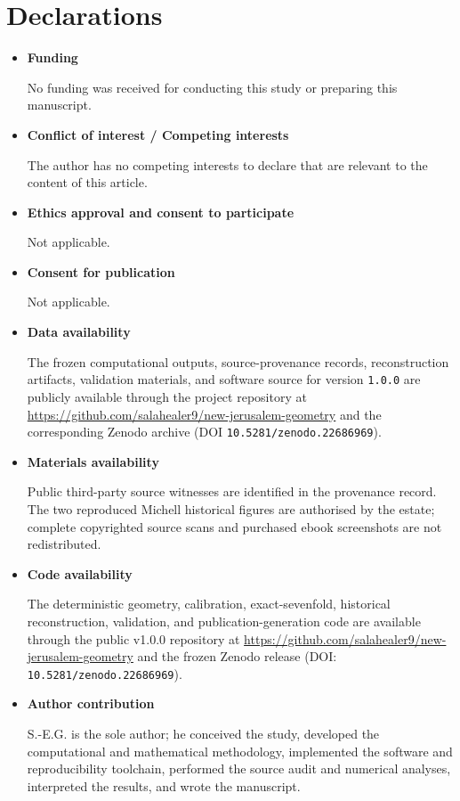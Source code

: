\documentclass[11pt]{article}
\begin{document}
\section*{Declarations}

\begin{itemize}

\item \textbf{Funding}

No funding was received for conducting this study or preparing this
manuscript.

\item \textbf{Conflict of interest / Competing interests}

The author has no competing interests to declare that are relevant to the
content of this article.

\item \textbf{Ethics approval and consent to participate}

Not applicable.

\item \textbf{Consent for publication}

Not applicable.

\item \textbf{Data availability}

The frozen computational outputs, source-provenance records,
reconstruction artifacts, validation materials, and software source for
version \texttt{1.0.0} are publicly available through the project repository
at \url{https://github.com/salahealer9/new-jerusalem-geometry} and the corresponding Zenodo archive
\citep{gherbi2026newjerusalemgeometry} (DOI
\texttt{10.5281/zenodo.22686969}).


\item \textbf{Materials availability}

Public third-party source witnesses are identified in the provenance record.
The two reproduced Michell historical figures are authorised by the estate;
complete copyrighted source scans and purchased ebook screenshots are not
redistributed.

\item \textbf{Code availability}

The deterministic geometry, calibration, exact-sevenfold, historical
reconstruction, validation, and publication-generation code are available
through the public v1.0.0 repository at
\url{https://github.com/salahealer9/new-jerusalem-geometry} and the
frozen Zenodo release (DOI: \texttt{10.5281/zenodo.22686969}).

\item \textbf{Author contribution}

S.-E.G. is the sole author; he conceived the study, developed the computational
and mathematical methodology, implemented the software and reproducibility
toolchain, performed the source audit and numerical analyses, interpreted the
results, and wrote the manuscript.

\end{itemize}
\end{document}
